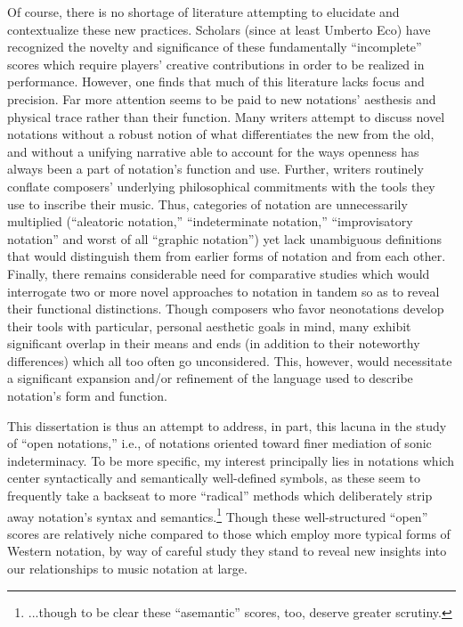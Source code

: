 Of course, there is no shortage of literature attempting to elucidate and contextualize these new practices. 
Scholars (since at least Umberto Eco) have recognized the novelty and significance of these fundamentally ``incomplete'' scores which require players' creative contributions in order to be realized in performance. 
However, one finds that much of this literature lacks focus and precision. 
Far more attention seems to be paid to new notations' aesthesis and physical trace rather than their function.
Many writers attempt to discuss novel notations without a robust notion of what differentiates the new from the old, and without a unifying narrative able to account for the ways openness has always been a part of notation's function and use.
Further, writers routinely conflate composers' underlying philosophical commitments with the tools they use to inscribe their music.
Thus, categories of notation are unnecessarily multiplied (``aleatoric notation,'' ``indeterminate notation,'' ``improvisatory notation'' and worst of all ``graphic notation'') yet lack unambiguous definitions that would distinguish them from earlier forms of notation and from each other.
Finally, there remains considerable need for comparative studies which would interrogate two or more novel approaches to notation in tandem so as to reveal their functional distinctions.
Though composers who favor neonotations develop their tools with particular, personal aesthetic goals in mind, many exhibit significant overlap in their means and ends (in addition to their noteworthy differences) which all too often go unconsidered.
This, however, would necessitate a significant expansion and/or refinement of the language used to describe notation's form and function.

    
This dissertation is thus an attempt to address, in part, this lacuna in the study of ``open notations,'' i.e., of notations oriented toward finer mediation of sonic indeterminacy.
To be more specific, my interest principally lies in notations which center syntactically and semantically well-defined symbols, as these seem to frequently take a backseat to more ``radical'' methods which deliberately strip away notation's syntax and semantics.\footnote{...though to be clear these ``asemantic'' scores, too, deserve greater scrutiny.}
Though these well-structured ``open'' scores are relatively niche compared to those which employ more typical forms of Western notation, by way of careful study they stand to reveal new insights into our relationships to music notation at large.

